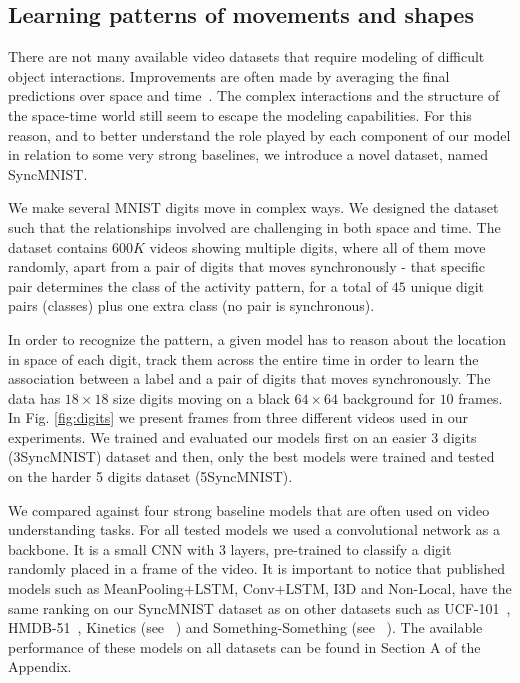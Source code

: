 \documentclass{article}
\begin{document}
\subsection{Learning patterns of movements and shapes}


There are not many available video datasets that require modeling of difficult object interactions. Improvements are often made by averaging the final predictions over space and time~\cite{chen20182_a2nets}. The complex interactions and the structure of the space-time world still seem to escape the modeling capabilities. For this reason, and to better understand the role played by each component of our model in relation to some very strong baselines, we introduce a novel dataset, named SyncMNIST.

We make several MNIST digits move  in complex ways. We designed the dataset such that the relationships involved are challenging in both space and time. The dataset contains $600K$ videos showing multiple digits, where all of them move randomly, apart from a pair of digits that moves synchronously - that specific pair determines the class of the activity pattern, for a total of $45$ unique digit pairs (classes) plus one extra class (no pair is synchronous).

In order to recognize the pattern, a given model has to reason about the location in space of each digit, track them across the entire time in order to learn the association between a label and a pair of digits that moves synchronously. The data has $18 \times 18$ size digits moving on a black $64 \times 64$ background for $10$ frames. In Fig. \ref{fig:digits} we present frames from three different videos used in our experiments. We trained and evaluated our models first on an easier 3 digits (3SyncMNIST) dataset and then, only the best models were trained and tested on the harder 5 digits dataset (5SyncMNIST).

 We compared against four strong baseline models that are often used on video understanding tasks. For all tested models we used a convolutional network as a backbone. It is a small CNN with 3 layers, pre-trained to classify a digit randomly placed in a frame of the video. It is important to notice that published models such as MeanPooling+LSTM, Conv+LSTM, I3D and Non-Local, have the same ranking on our SyncMNIST dataset as on other datasets such as UCF-101~\cite{soomro2012ucf101},  HMDB-51~\cite{kuehne2011hmdb}, Kinetics (see ~\cite{carreira2017quo}) and Something-Something (see  ~\cite{wang2018videos_gupta2}). The available performance of these models on all datasets can be found in Section A of the Appendix.  
\end{document}
